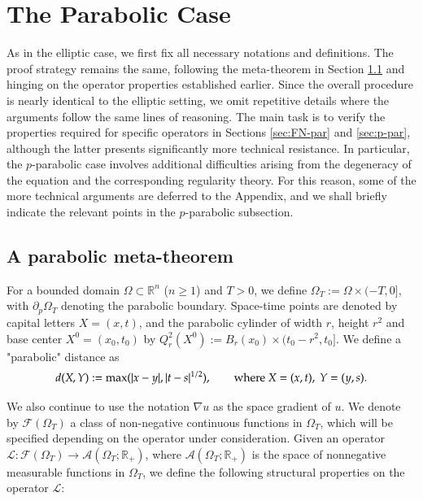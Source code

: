\documentclass[11pt,oneside,english]{amsart}
\newcommand{\R}{{\mathbb R}}
\newcommand{\cL}{{\mathcal L}}
\newcommand{\cA}{{\mathcal A}}
\newcommand{\cF}{{\mathcal F}}
\numberwithin{equation}{section}
\theoremstyle{plain}
\numberwithin{equation}{section}
\begin{document}
\section{The Parabolic Case}\label{sec:par}



As in  the elliptic case, we first fix all  necessary notations and definitions. The proof strategy remains the same, following the meta-theorem in Section \ref{sec:par-meta} and hinging on the operator properties established earlier. Since the overall procedure is nearly identical to the elliptic setting, we omit repetitive details where the arguments follow the same lines of reasoning. The main task is to verify the properties required for specific operators in Sections \ref{sec:FN-par} and \ref{sec:p-par}, although the latter presents significantly more technical resistance.
In particular, the $p$-parabolic case involves additional difficulties arising from the
degeneracy of the equation and the corresponding regularity theory. For this reason,
some of the more technical arguments are deferred to the Appendix, and we shall
briefly indicate the relevant points in the $p$-parabolic subsection.





\subsection{A parabolic meta-theorem}\label{sec:par-meta}
For a bounded domain $\Omega \subset \mathbb{R}^n$ ($n \ge 1$) and $T > 0$, we define $\Omega_T := \Omega \times (-T, 0]$, with $\partial_p \Omega_T$ denoting the parabolic boundary.
Space-time points are denoted by capital letters $X= (x,t)$, and the parabolic cylinder of width $r$, height $r^2 $ and base center $X^0 =(x_0,t_0)$ 
by   
$Q^2_r (X^0):= B_r(x_0)\times (t_0-r^2,t_0]$.
We define a "parabolic" distance as 
$$d(X,Y):= \max(|x-y|,|t-s|^{1/2}),\qquad 
\hbox{where } X=(x,t),\ Y=(y,s).$$ 




We also continue to use the notation  $\nabla  u $ as the space gradient of $u$. 
We denote by $\cF(\Omega_T)$ a class of non-negative continuous functions in $\Omega_T$, which will be specified depending on the operator under consideration.
Given  an operator $\cL:\cF(\Omega_T)\to \cA(\Omega_T;\R_+)$, where $\cA(\Omega_T;\R_+)$ is the space of nonnegative measurable functions in $\Omega_T$, we define the following structural properties on the operator $\cL $:
\end{document}
